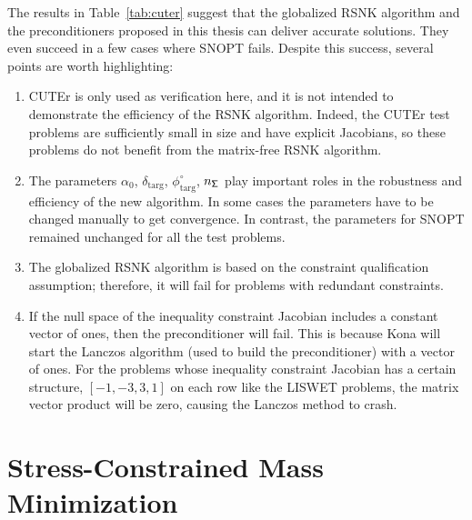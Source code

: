 The results in Table~\ref{tab:cuter} suggest 
that the globalized RSNK algorithm and the preconditioners proposed in this thesis can deliver accurate solutions. They even succeed in a few cases where SNOPT fails. Despite this success, several points are worth highlighting:
\begin{enumerate}
\item CUTEr is only used as verification here, and it is not intended to demonstrate the efficiency of the RSNK algorithm.  Indeed, the CUTEr test problems are sufficiently small in size and have explicit Jacobians, so these problems do not benefit from the matrix-free RSNK algorithm.

\item The parameters \textbf{$\alpha_0$},  $\delta_{\text{targ}}$, $\phi^{\circ}_{\text{targ}}$,  $n_{\mathsf{\Sigma}}$ play important roles in the robustness and efficiency of the new algorithm. In some cases the parameters have to be changed manually to get convergence. In contrast, the parameters for SNOPT remained unchanged for all the test problems. 
\item The globalized RSNK algorithm is based on the constraint qualification assumption; therefore, it will fail for problems with redundant constraints.    
\item If the null space of the inequality constraint Jacobian includes a constant   vector of ones, then the preconditioner will fail. This is because Kona will start the Lanczos algorithm (used to build the preconditioner) with a vector of ones.
 For the problems whose inequality constraint Jacobian has a certain structure, \eg $[-1, -3, 3, 1]$ on each row like the LISWET problems, the matrix vector product will be zero, causing the Lanczos method to crash. 
\end{enumerate} 



\newpage

\section{Stress-Constrained Mass Minimization}\label{sec:fstopo2}

